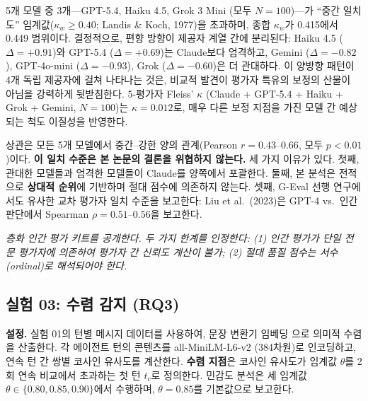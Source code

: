 5개 모델 중 3개---GPT-5.4, Haiku 4.5, Grok 3 Mini (모두 $N=100$)---가 ``중간 일치도'' 임계값($\kappa_w \geq 0.40$; Landis \& Koch, 1977)을 초과하며, 종합 $\kappa_w$가 0.415에서 0.449 범위이다. 결정적으로, 편향 방향이 제공자 계열 간에 분리된다: Haiku 4.5 ($\Delta = +0.91$)와 GPT-5.4 ($\Delta = +0.69$)는 Claude보다 엄격하고, Gemini ($\Delta = -0.82$), GPT-4o-mini ($\Delta = -0.93$), Grok ($\Delta = -0.60$)은 더 관대하다. 이 양방향 패턴이 4개 독립 제공자에 걸쳐 나타나는 것은, 비교적 발견이 평가자 특유의 보정의 산물이 아님을 강력하게 뒷받침한다. 5-평가자 Fleiss' $\kappa$ (Claude + GPT-5.4 + Haiku + Grok + Gemini, $N=100$)는 $\kappa = 0.012$로, 매우 다른 보정 지점을 가진 모델 간 예상되는 척도 이질성을 반영한다.

상관은 모든 5개 모델에서 중간--강한 양의 관계(Pearson $r = 0.43$--$0.66$, 모두 $p < 0.01$)이다. \textbf{이 일치 수준은 본 논문의 결론을 위협하지 않는다.} 세 가지 이유가 있다. 첫째, 관대한 모델들과 엄격한 모델들이 Claude를 양쪽에서 포괄한다. 둘째, 본 분석은 전적으로 \textbf{상대적 순위}에 기반하며 절대 점수에 의존하지 않는다. 셋째, G-Eval 선행 연구에서도 유사한 교차 평가자 일치 수준을 보고한다: Liu et al.\ (2023)은 GPT-4 vs.\ 인간 판단에서 Spearman $\rho = 0.51$--$0.56$을 보고한다.

\emph{층화 인간 평가 키트를 공개한다. 두 가지 한계를 인정한다: (1) 인간 평가가 단일 전문 평가자에 의존하여 평가자 간 신뢰도 계산이 불가; (2) 절대 품질 점수는 서수(ordinal)로 해석되어야 한다.}

\subsection{실험 03: 수렴 감지 (RQ3)}
\label{sec:exp03}

\textbf{설정.} 실험 01의 턴별 메시지 데이터를 사용하여, 문장 변환기 임베딩 \citep{reimers2019sentence}으로 의미적 수렴을 산출한다. 각 에이전트 턴의 콘텐츠를 all-MiniLM-L6-v2 (384차원)로 인코딩하고, 연속 턴 간 쌍별 코사인 유사도를 계산한다. \textbf{수렴 지점}은 코사인 유사도가 임계값 $\theta$를 2회 연속 비교에서 초과하는 첫 턴 $t_c$로 정의한다. 민감도 분석은 세 임계값 $\theta \in \{0.80, 0.85, 0.90\}$에서 수행하며, $\theta=0.85$를 기본값으로 보고한다.

